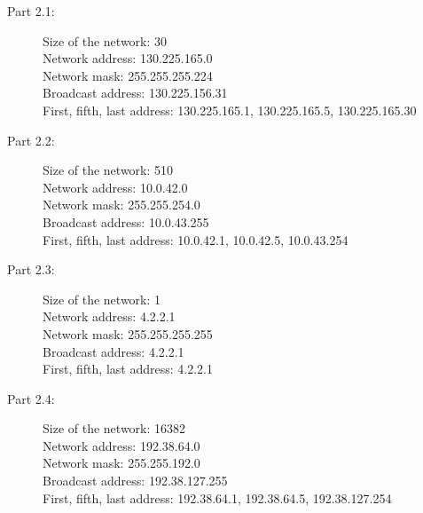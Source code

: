 \begin{description}
    \item[Part 2.1:]
        Size of the network: 30\\
        Network address: 130.225.165.0\\
        Network mask: 255.255.255.224\\
        Broadcast address: 130.225.156.31\\
        First, fifth, last address: 130.225.165.1, 130.225.165.5, 130.225.165.30
    \item[Part 2.2:]
        Size of the network: 510\\
        Network address: 10.0.42.0\\
        Network mask: 255.255.254.0\\
        Broadcast address: 10.0.43.255\\
        First, fifth, last address: 10.0.42.1, 10.0.42.5, 10.0.43.254
    \item[Part 2.3:]
        Size of the network: 1\\
        Network address: 4.2.2.1\\
        Network mask: 255.255.255.255\\
        Broadcast address: 4.2.2.1\\
        First, fifth, last address: 4.2.2.1
    \item[Part 2.4:]
        Size of the network: 16382\\
        Network address: 192.38.64.0\\
        Network mask: 255.255.192.0\\
        Broadcast address: 192.38.127.255\\
        First, fifth, last address: 192.38.64.1, 192.38.64.5, 192.38.127.254
\end{description}

